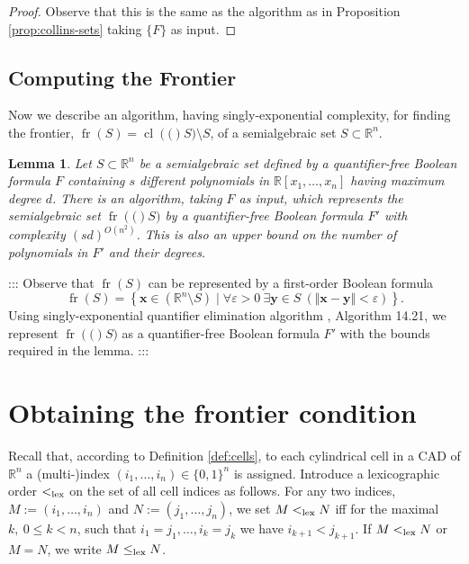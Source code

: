\documentclass[
]{book}
\newtheorem{lemma}{Lemma}[chapter]
\theoremstyle{definition}
\theoremstyle{definition}
\theoremstyle{definition}
\theoremstyle{definition}
\theoremstyle{remark}
\begin{document}
\begin{proof}
Observe that this is the same as the algorithm as in Proposition \ref{prop:collins-sets} taking \(\{F\}\) as input.
\end{proof}

\hypertarget{computing-the-frontier}{%
\subsection{Computing the Frontier}\label{computing-the-frontier}}

Now we describe an algorithm, having singly-exponential complexity, for finding the frontier, \({\operatorname{fr} \left( S \right)}={\operatorname{cl} \left( ( \right)}S) \setminus S\),
of a semialgebraic set \(S \subset \mathbb{R}^n\).

\begin{lemma}
\protect\hypertarget{lem:novel-frontier-fr}{}\label{lem:novel-frontier-fr}Let \(S \subset \mathbb{R}^n\) be a semialgebraic set defined by a quantifier-free Boolean formula \(F\)
containing \(s\) different polynomials in \(\mathbb{R}[x_1, \ldots ,x_n]\) having maximum degree \(d\).
There is an algorithm, taking \(F\) as input, which represents the semialgebraic set \({\operatorname{fr} \left( ( \right)}S)\) by a quantifier-free Boolean formula \(F'\) with complexity \((sd)^{O(n^2)}\).
This is also an upper bound on the number of polynomials in \(F'\) and their degrees.
\end{lemma}

:::
Observe that \({\operatorname{fr} \left( S \right)}\) can be represented by a first-order Boolean formula
\[
{\operatorname{fr} \left( S \right)} = \left\{ \mathbf{x} \in (\mathbb{R}^n \setminus S) \mid \forall \varepsilon >0\> \exists \mathbf{y} \in S\> (\Vert \mathbf{x} - \mathbf{y} \Vert < \varepsilon ) \right\}.
\]
Using singly-exponential quantifier elimination algorithm \citet{bpr2006}, Algorithm 14.21, we represent \({\operatorname{fr} \left( ( \right)}S)\)
as a quantifier-free Boolean formula \(F'\) with the bounds required in the lemma.
:::

\hypertarget{obtaining-the-frontier-condition}{%
\section{Obtaining the frontier condition}\label{obtaining-the-frontier-condition}}

Recall that, according to Definition \ref{def:cells}, to each cylindrical cell in a CAD of \(\mathbb{R}^n\) a (multi-)index
\((i_1, \ldots ,i_n) \in \{ 0,1 \}^n\) is assigned.
Introduce a lexicographic order \(<_{\rm{lex}}\) on the set of all cell indices as follows.
For any two indices, \(M:=(i_1,\ldots,i_n)\) and \(N:=(j_1,\ldots,j_n)\), we set \(M <_{\rm{lex}}N\)
iff for the maximal \(k,\ 0 \le k <n\), such that \(i_1=j_1, \ldots, i_k=j_k\) we have \(i_{k+1} < j_{k+1}\).
If \(M <_{\rm{lex}}N\) or \(M = N\), we write \(M \le_{\rm{lex}}N\).
\end{document}
